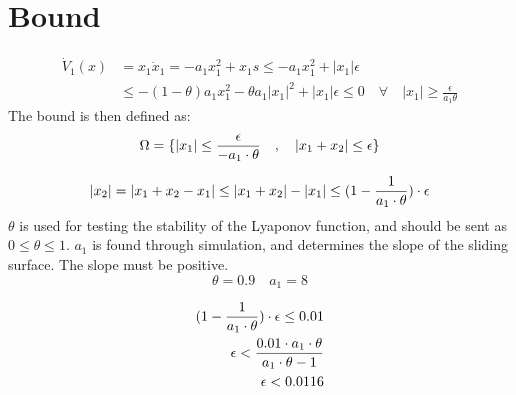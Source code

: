 \section{Bound} %
\label{sec:bound}

\begin{equation}
        \begin{split}
                \dot{V}_1(x) &= x_1 \dot{x}_1 = -a_1 x_1^2 + x_1 s \leq -a_1 x_1^2 + |x_1| \epsilon \\
                &\leq -(1-\theta)a_1 x_1^2 - \theta a_1|x_1|^2 + |x_1|\epsilon \leq 0 \quad \forall \quad |x_1| \geq \frac{\epsilon}{a_1 \theta}
        \end{split}
\end{equation}
The bound is then defined as:
\begin{equation}
  \Omega = \{ |x_1| \leq \frac{\epsilon}{-a_1 \cdot \theta} \quad , \quad |x_1 + x_2| \leq \epsilon \}
\end{equation}

\begin{equation}
  |x_2| = |x_1 + x_2 - x_1| \leq |x_1 + x_2| - |x_1| \leq (1 - \frac{1}{a_1 \cdot \theta}) \cdot \epsilon
\end{equation}
$\theta$ is used for testing the stability of the Lyaponov function, and should be sent as $0 \leq \theta \leq 1$. $a_1$ is found through simulation, and determines the slope of the sliding surface. The slope must be positive.
\begin{equation}
  \theta = 0.9 \quad a_1 = 8
\end{equation}

\begin{equation}
  \begin{split}
    (1-\frac{1}{a_1 \cdot \theta}) \cdot \epsilon \leq 0.01 \\
    \epsilon < \frac{0.01 \cdot a_1 \cdot \theta}{a_1 \cdot \theta - 1} \\
    \epsilon < 0.0116
  \end{split}
\end{equation}





